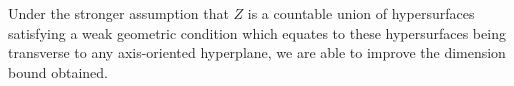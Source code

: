 \documentclass[12pt,reqno]{article}
\numberwithin{equation}{section}
\DeclareMathOperator{\fordim}{\dim_{\mathbf{F}}}
\DeclareMathOperator{\RR}{\mathbf{R}}
\DeclareMathOperator{\ZZ}{\mathbf{Z}}
\numberwithin{theorem}{section}
\begin{document}
\begin{comment}
A well-known result in this pattern avoidance setting is that sets with large Fourier dimension satisfy many algebraic relations. More precisely, if integer coefficients $m_1, \dots, m_n \in \ZZ$ are fixed, and we consider a compact set $X \subset \RR$ with $\fordim(X) > 2/n$, then the sum set $m_1 X + \dots + m_n X$ contains an open interval. It follows by a slight modification of these coefficients that if $X \subset \RR$ and $\fordim(X) > 2/n$, then there exists $m_1, \dots, m_n \in \ZZ$, distinct points $x_1, \dots, x_n \in X$, and an additional integer $a \in \ZZ$, such that
%
\begin{equation} \label{intequation}
    m_1 x_1 + \dots + m_n x_n = a.
\end{equation}
%
It is an interesting to determine how tight this result is. In \cite{Korner2}, T.W. K\"{o}rner constructs a Salem set $X$ with Fourier dimension $1/(n-1)$ such that for non-zero $m \in \ZZ^n$, and $a \in \ZZ$, $X$ does not contain distinct points $x_1, \dots, x_n$ solving \eqref{intequation}. If, for each nonzero $m \in \ZZ^n$ and $a \in \ZZ$, we consider the set
%
\[ Z_{m,a} = \left\{ (x_1, \dots, x_n) \in [0,1]^n : m_1x_1 + \dots + m_n x_n = a \right\}, \]
%
then $Z_{m,a}$ is a subset of an $n-1$ dimensional hyperplane, and thus can be easily seen to have Minkowski dimension $n-1$. It follows that we can apply Theorem \ref{maintheorem} to $Z = \bigcup \{ Z_{m,a} : m \neq 0, a \in \ZZ \}$ to obtain a Salem set $X \subset [0,1]$ with dimension
%
\[ \frac{n - (n-1)}{n - 1} = \frac{1}{n-1}, \]
%
such that $(x_1, \dots, x_n) \not \in Z$ for each distinct $x_1, \dots, x_n \in X$. This means precisely that $X$ avoids solutions to $\eqref{intequation}$ for all nonzero $m \in \ZZ^n$ and $a \in \ZZ$. Thus we see Theorem \ref{maintheorem} generalizes K\"{o}rner's result, and thus shows the result depends little on the arithmetic properties of the pattern K\"{o}rner avoids, but rather, depends only on the `thickness' of the family of tuples $(x_1, \dots, x_n)$ satisfying the pattern. Since we expect Theorem \ref{maintheorem} to be tight for general sets, an improvement to K\"{o}rner's construction must rely more heavily on the algebraic properties of the pattern involved.
\end{comment}

Under the stronger assumption that $Z$ is a countable union of hypersurfaces satisfying a weak geometric condition which equates to these hypersurfaces being transverse to any axis-oriented hyperplane, we are able to improve the dimension bound obtained.
\end{document}
